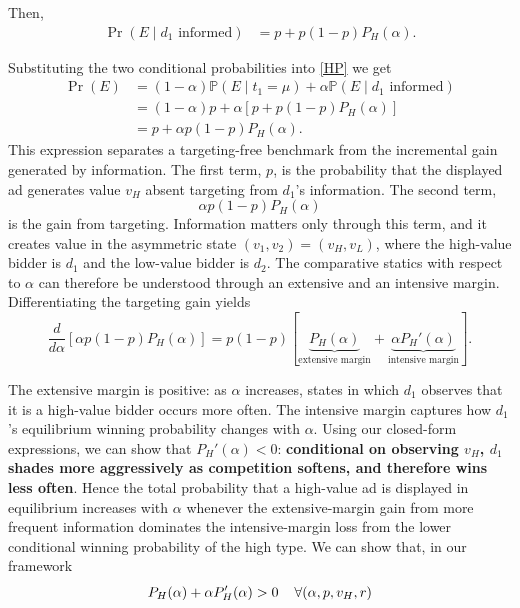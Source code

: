 \documentclass[11pt]{article}
\theoremstyle{plain}
\theoremstyle{definition}
\theoremstyle{plain}
\theoremstyle{plain}
\theoremstyle{plain}
\theoremstyle{plain}
\numberwithin{equation}{section}
\begin{document}
\vspace{0.2cm}

\noindent Then,
\begin{align*}
\Pr(E\mid d_1\text{ informed})
&=
p+p(1-p)P_H(\alpha).
\end{align*}

\vspace{0.2cm}

\noindent Substituting the two conditional probabilities into \eqref{HP} we get
\begin{align*}
\Pr(E)
&=
(1-\alpha)\mathbb{P}(E \mid t_1=\mu)
+
\alpha\mathbb{P}(E\mid d_1\text{ informed}) \\
&=
(1-\alpha)p+\alpha\left[p+p(1-p)P_H(\alpha)\right] \\
&=
p+\alpha p(1-p)P_H(\alpha).
\end{align*}
This expression separates a targeting-free benchmark from the incremental gain generated by information. The first term, $p$, is the probability that the displayed ad generates value $v_H$ absent targeting from $d_1$'s information. The second term,
\[
\alpha p(1-p)P_H(\alpha)
\]
is the gain from targeting. Information matters only through this term, and it creates value in the asymmetric state $(v_1,v_2)=(v_H,v_L)$, where the high-value bidder is $d_1$ and the low-value bidder is $d_2$. The comparative statics with respect to $\alpha$ can therefore be understood through an extensive and an intensive margin. Differentiating the targeting gain yields
\[
\frac{d}{d\alpha}\left[\alpha p(1-p)P_H(\alpha)\right]
=
p(1-p)
\left[
\underbrace{P_H(\alpha)}_{\text{extensive margin}}
+
\underbrace{\alpha P_H'(\alpha)}_{\text{intensive margin}}
\right].
\]

\vspace{0.2cm}

\noindent The extensive margin is positive: as $ \alpha $ increases, states in which $ d_1 $ observes that it is a high-value bidder occurs more often. The intensive margin captures how $ d_1 $'s equilibrium winning probability changes with $ \alpha $. Using our closed-form expressions, we can show that $ P_H'(\alpha) < 0 $: \textbf{conditional on observing $ v_H $, $ d_1 $ shades more aggressively as competition softens, and therefore wins less often}. Hence the total probability that a high-value ad is displayed in equilibrium increases with $ \alpha $ whenever the extensive-margin gain from more frequent information dominates the intensive-margin loss from the lower conditional winning probability of the high type. We can show that, in our framework 
\[
P_H(\alpha) + \alpha P_H'(\alpha) > 0 \hspace{0.4cm} \forall (\alpha, p, v_H, r)
\]
\end{document}
